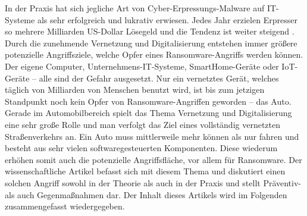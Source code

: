 In der Praxis hat sich jegliche Art von Cyber-Erpressungs-Malware auf IT-Systeme 
als sehr erfolgreich und lukrativ erwiesen. Jedes Jahr erzielen Erpresser so 
mehrere Milliarden US-Dollar Lösegeld und die Tendenz ist weiter steigend \cite[vgl.]{C..24.05.2020}. 
Durch die zunehmende Vernetzung und Digitalisierung entstehen immer größere 
potenzielle Angriffsziele, welche Opfer eines Ransomware-Angriffs werden können. 
Der eigene Computer, Unternehmens-IT-Systeme, SmartHome-Geräte oder IoT-Geräte – 
alle sind der Gefahr ausgesetzt. Nur ein vernetztes Gerät, welches täglich von 
Milliarden von Menschen benutzt wird, ist bis zum jetzigen Standpunkt noch kein 
Opfer von Ransomware-Angriffen geworden – das Auto. Gerade im Automobilbereich 
spielt das Thema Vernetzung und Digitalisierung eine sehr große Rolle und man 
verfolgt das Ziel eines vollständig vernetzten Straßenverkehrs an. Ein Auto muss 
mittlerweile mehr können als nur fahren und besteht aus sehr vielen softwaregesteuerten 
Komponenten. Diese wiederum erhöhen somit auch die potenzielle Angriffsfläche, vor 
allem für Ransomware. 
\newline
Der wissenschaftliche Artikel \cite{M.Wolf.2017} befasst sich mit diesem Thema und diskutiert 
einen solchen Angriff sowohl in der Theorie als auch in der Praxis und stellt Präventiv- 
als auch Gegenmaßnahmen dar. Der Inhalt dieses Artikels wird im Folgenden zusammengefasst 
wiedergegeben. 
